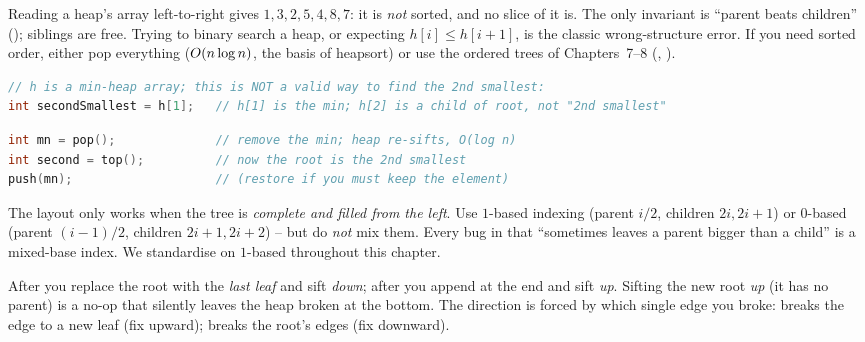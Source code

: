 \begin{warningbox}
Reading a heap's array left-to-right gives $1,3,2,5,4,8,7$: it is \emph{not} sorted, and no slice of it is.
The only invariant is ``parent beats children'' (); siblings are free. Trying to binary
search a heap, or expecting $h[i]\le h[i+1]$, is the classic wrong-structure error. If you need sorted
order, either pop everything ($O(n\log n)$, the basis of heapsort) or use the ordered trees of
Chapters~7--8 (, ).
\end{warningbox}
\begin{lstlisting}[caption={\textcolor{warningred}{WRONG}: treating a heap array as sorted}, language=C++, basicstyle=\ttfamily\small]
// h is a min-heap array; this is NOT a valid way to find the 2nd smallest:
int secondSmallest = h[1];   // h[1] is the min; h[2] is a child of root, not "2nd smallest"
\end{lstlisting}
\begin{lstlisting}[caption={\textcolor{successgreen}{RIGHT}: the 2nd extreme comes from a second pop}, language=C++, basicstyle=\ttfamily\small]
int mn = pop();              // remove the min; heap re-sifts, O(log n)
int second = top();          // now the root is the 2nd smallest
push(mn);                    // (restore if you must keep the element)
\end{lstlisting}

\begin{warningbox}
The layout only works when the tree is \emph{complete and filled from the left}. Use $1$-based indexing
(parent $i/2$, children $2i,2i{+}1$) or $0$-based (parent $(i-1)/2$, children $2i{+}1,2i{+}2$) -- but do
\emph{not} mix them. Every bug in  that ``sometimes leaves a parent bigger than a
child'' is a mixed-base index. We standardise on $1$-based throughout this chapter.
\end{warningbox}

\begin{warningbox}
After  you replace the root with the \emph{last leaf} and sift \emph{down}; after  you
append at the end and sift \emph{up}. Sifting the new root \emph{up} (it has no parent) is a no-op that
silently leaves the heap broken at the bottom. The direction is forced by which single edge you broke:
 breaks the edge to a new leaf (fix upward);  breaks the root's edges (fix downward).
\end{warningbox}

